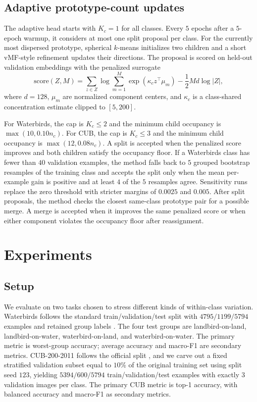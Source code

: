 \documentclass[10pt,twocolumn]{article}
\begin{document}
\subsection{Adaptive prototype-count updates}
The adaptive head starts with $K_c = 1$ for all classes. Every $5$ epochs after a $5$-epoch warmup, it considers at most one split proposal per class. For the currently most dispersed prototype, spherical $k$-means initializes two children and a short vMF-style refinement updates their directions. The proposal is scored on held-out validation embeddings with the penalized surrogate
\begin{equation}
\mathrm{score}(Z, M) =
\sum_{z \in Z} \log \sum_{m=1}^{M} \exp(\kappa_c z^\top \mu_m)
- \frac{1}{2} M d \log |Z|,
\end{equation}
where $d = 128$, $\mu_m$ are normalized component centers, and $\kappa_c$ is a class-shared concentration estimate clipped to $[5, 200]$.

For Waterbirds, the cap is $K_c \leq 2$ and the minimum child occupancy is $\max(10, 0.10n_c)$. For CUB, the cap is $K_c \leq 3$ and the minimum child occupancy is $\max(12, 0.08n_c)$. A split is accepted when the penalized score improves and both children satisfy the occupancy floor. If a Waterbirds class has fewer than $40$ validation examples, the method falls back to $5$ grouped bootstrap resamples of the training class and accepts the split only when the mean per-example gain is positive and at least $4$ of the $5$ resamples agree. Sensitivity runs replace the zero threshold with stricter margins of $0.0025$ and $0.005$. After split proposals, the method checks the closest same-class prototype pair for a possible merge. A merge is accepted when it improves the same penalized score or when either component violates the occupancy floor after reassignment.

\section{Experiments}
\label{sec:experiments}
\subsection{Setup}
We evaluate on two tasks chosen to stress different kinds of within-class variation. Waterbirds follows the standard train/validation/test split with $4795/1199/5794$ examples and retained group labels \citep{sagawa2020distributionally,koh2021wilds}. The four test groups are landbird-on-land, landbird-on-water, waterbird-on-land, and waterbird-on-water. The primary metric is worst-group accuracy; average accuracy and macro-F1 are secondary metrics. CUB-200-2011 follows the official split \citep{wah2011caltech}, and we carve out a fixed stratified validation subset equal to $10\%$ of the original training set using split seed $123$, yielding $5394/600/5794$ train/validation/test examples with exactly $3$ validation images per class. The primary CUB metric is top-1 accuracy, with balanced accuracy and macro-F1 as secondary metrics.
\end{document}
